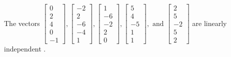 \begin{exercise}
\begin{exerciseStatement}
  \end{exerciseStatement}
  \begin{exerciseAnswer}
   The vectors \(\left[\begin{array}{r}
0 \\
2 \\
4 \\
0 \\
-1
\end{array}\right] , \left[\begin{array}{r}
-2 \\
2 \\
-6 \\
-4 \\
1
\end{array}\right] , \left[\begin{array}{r}
1 \\
-6 \\
-2 \\
2 \\
0
\end{array}\right] , \left[\begin{array}{r}
5 \\
4 \\
-5 \\
1 \\
1
\end{array}\right] , \text{ and } \left[\begin{array}{r}
2 \\
5 \\
-2 \\
5 \\
2
\end{array}\right]\) are 
  	 linearly independent  .
  


  \end{exerciseAnswer}
\end{exercise}